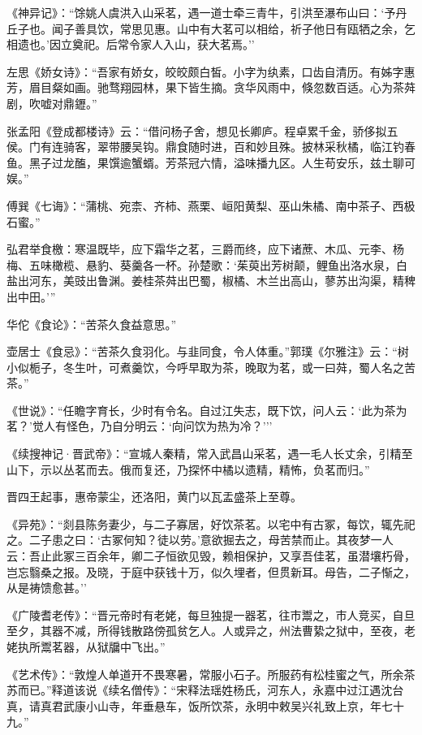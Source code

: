 \documentclass[]{article}
\begin{document}
《神异记》：``馀姚人虞洪入山采茗，遇一道士牵三青牛，引洪至瀑布山曰：`予丹丘子也。闻子善具饮，常思见惠。山中有大茗可以相给，祈子他日有瓯牺之余，乞相遗也。'因立奠祀。后常令家人入山，获大茗焉。''

左思《娇女诗》：``吾家有娇女，皎皎颇白皙。小字为纨素，口齿自清历。有姊字惠芳，眉目粲如画。驰骛翔园林，果下皆生摘。贪华风雨中，倏忽数百适。心为茶荈剧，吹嘘对鼎䥶。''

张孟阳《登成都楼诗》云：``借问杨子舍，想见长卿庐。程卓累千金，骄侈拟五侯。门有连骑客，翠带腰吴钩。鼎食随时进，百和妙且殊。披林采秋橘，临江钓春鱼。黑子过龙醢，果馔逾蟹蝑。芳茶冠六情，溢味播九区。人生苟安乐，兹土聊可娱。''

傅巽《七诲》：``蒲桃、宛柰、齐柿、燕栗、峘阳黄梨、巫山朱橘、南中茶子、西极石蜜。''

弘君举食檄：寒温既毕，应下霜华之茗，三爵而终，应下诸蔗、木瓜、元李、杨梅、五味橄榄、悬豹、葵羹各一杯。孙楚歌：`茱萸出芳树颠，鲤鱼出洛水泉，白盐出河东，美豉出鲁渊。姜桂茶荈出巴蜀，椒橘、木兰出高山，蓼苏出沟渠，精稗出中田。'''

华佗《食论》：``苦茶久食益意思。''

壶居士《食忌》：``苦茶久食羽化。与韭同食，令人体重。''郭璞《尔雅注》云：``树小似栀子，冬生叶，可煮羹饮，今呼早取为茶，晚取为茗，或一曰荈，蜀人名之苦茶。''

《世说》：``任瞻字育长，少时有令名。自过江失志，既下饮，问人云：`此为茶为茗？'觉人有怪色，乃自分明云：`向问饮为热为冷？'''

《续搜神记·晋武帝》：``宣城人秦精，常入武昌山采茗，遇一毛人长丈余，引精至山下，示以丛茗而去。俄而复还，乃探怀中橘以遗精，精怖，负茗而归。''

晋四王起事，惠帝蒙尘，还洛阳，黄门以瓦盂盛茶上至尊。

《异苑》：``剡县陈务妻少，与二子寡居，好饮茶茗。以宅中有古冢，每饮，辄先祀之。二子患之曰：`古冢何知？徒以劳。'意欲掘去之，母苦禁而止。其夜梦一人云：吾止此冢三百余年，卿二子恒欲见毁，赖相保护，又享吾佳茗，虽潜壤朽骨，岂忘翳桑之报。及晓，于庭中获钱十万，似久埋者，但贯新耳。母告，二子惭之，从是祷馈愈甚。''

《广陵耆老传》：``晋元帝时有老姥，每旦独提一器茗，往市鬻之，市人竞买，自旦至夕，其器不减，所得钱散路傍孤贫乞人。人或异之，州法曹絷之狱中，至夜，老姥执所鬻茗器，从狱牖中飞出。''

《艺术传》：``敦煌人单道开不畏寒暑，常服小石子。所服药有松桂蜜之气，所余茶苏而已。''释道该说《续名僧传》：``宋释法瑶姓杨氏，河东人，永嘉中过江遇沈台真，请真君武康小山寺，年垂悬车，饭所饮茶，永明中敕吴兴礼致上京，年七十九。''
\end{document}
